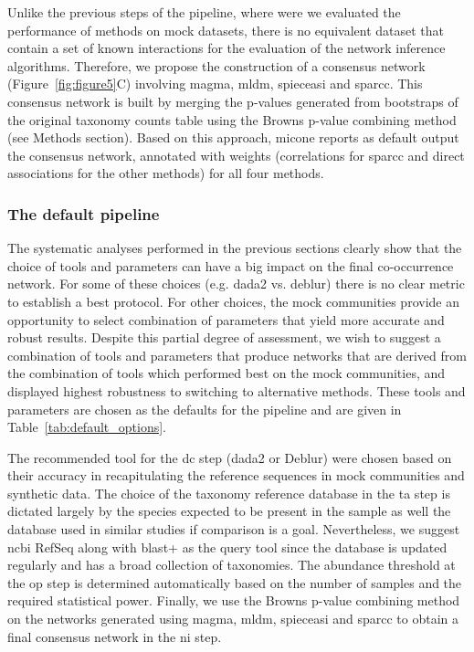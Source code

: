   Unlike the previous steps of the pipeline, where were we evaluated the performance of methods on mock datasets, there is no equivalent dataset that contain a set of known interactions for the evaluation of the network inference algorithms.
  Therefore, we propose the construction of a consensus network (Figure~\ref{fig:figure5}C) involving \ac{magma}, \ac{mldm}, \ac{spieceasi} and \ac{sparcc}. This consensus network is built by merging the p-values generated from bootstraps of the original taxonomy counts table using the Browns p-value combining method~\cite{brown_400_1975} (see Methods section).
  Based on this approach, \ac{micone} reports as default output the consensus network, annotated with weights (correlations for \ac{sparcc} and direct associations for the other methods) for all four methods.

  \FloatBarrier

  \subsubsection*{The default pipeline}

  The systematic analyses performed in the previous sections clearly show that the choice of tools and parameters can have a big impact on the final co-occurrence network. For some of these choices (e.g. \ac{dada2} vs. deblur) there is no clear metric to establish a best protocol.
  For other choices, the mock communities provide an opportunity to select combination of parameters that yield more accurate and robust results.
  Despite this partial degree of assessment, we wish to suggest a combination of tools and parameters that produce networks that are derived from the combination of tools which performed best on the mock communities, and displayed highest robustness to switching to alternative methods.
  These tools and parameters are chosen as the defaults for the pipeline and are given in Table~\ref{tab:default_options}.

  The recommended tool for the \ac{dc} step (\ac{dada2} or Deblur) were chosen based on their accuracy in recapitulating the reference sequences in mock communities and synthetic data.
  The choice of the taxonomy reference database in the \ac{ta} step is dictated largely by the species expected to be present in the sample as well the database used in similar studies if comparison is a goal.
  Nevertheless, we suggest \ac{ncbi} RefSeq along with blast+ as the query tool since the database is updated regularly and has a broad collection of taxonomies.
  The abundance threshold at the \ac{op} step is determined automatically based on the number of samples and the required statistical power.
  Finally, we use the Browns p-value combining method on the networks generated using \ac{magma}, \ac{mldm}, \ac{spieceasi} and \ac{sparcc} to obtain a final consensus network in the \ac{ni} step.


